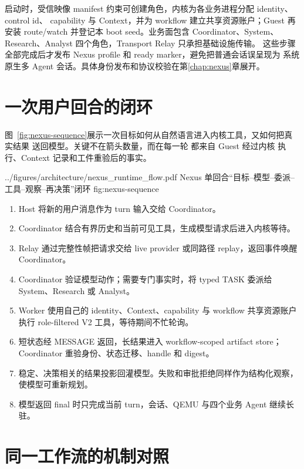 启动时，受信映像 manifest 约束可创建角色，内核为各业务进程分配 identity、control id、
capability 与 Context，并为 workflow 建立共享资源账户；Guest 再安装 route/watch 并登记本 boot seed。业务面包含
Coordinator、System、Research、Analyst 四个角色，Transport Relay 只承担基础设施传输。
这些步骤全部完成后才发布 Nexus profile 和 ready marker，避免把普通会话误呈现为
系统原生多 Agent 会话。具体身份发布和协议校验在第\ref{chap:nexus}章展开。

\section{一次用户回合的闭环}

图~\ref{fig:nexus-sequence}展示一次目标如何从自然语言进入内核工具，又如何把真实结果
送回模型。关键不在箭头数量，而在每一轮  都来自 Guest 经过内核
执行、Context 记录和工件重验后的事实。

  {../figures/architecture/nexus_runtime_flow.pdf}
  {Nexus 单回合“目标--模型--委派--工具--观察--再决策”闭环}
  {fig:nexus-sequence}

\begin{enumerate}
  \item Host 将新的用户消息作为 turn 输入交给 Coordinator。
  \item Coordinator 结合有界历史和当前可见工具，生成模型请求后进入内核等待。
  \item Relay 通过完整性帧把请求交给 live provider 或同路径 replay，返回事件唤醒 Coordinator。
  \item Coordinator 验证模型动作；需要专门事实时，将 typed TASK 委派给 System、Research 或 Analyst。
  \item Worker 使用自己的 identity、Context、capability 与 workflow 共享资源账户执行 role-filtered V2 工具，等待期间不忙轮询。
  \item 短状态经 MESSAGE 返回，长结果进入 workflow-scoped artifact store；Coordinator 重验身份、状态迁移、handle 和 digest。
  \item 稳定、决策相关的结果投影回灌模型。失败和审批拒绝同样作为结构化观察，使模型可重新规划。
  \item 模型返回 final 时只完成当前 turn，会话、QEMU 与四个业务 Agent 继续长驻。
\end{enumerate}

\section{同一工作流的机制对照}

